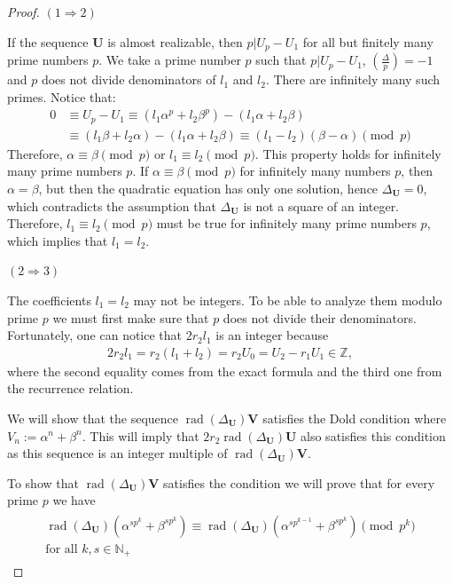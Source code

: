 \documentclass[preprint,12pt]{elsarticle}
\newcommand{\N}{\mathbb{N}}
\newcommand{\Z}{\mathbb{Z}}
\DeclareMathOperator{\rad}{rad}
\begin{document}
\begin{proof}

    $(1\Rightarrow 2)$

    If the sequence ${\mathbf U}$ is almost realizable, then $p|U_p-U_1$ for all but finitely many prime numbers $p$. We take a prime number $p$ such that $p|U_p-U_1$, $\left(\frac{\Delta}{p}\right)=-1$ and $p$ does not divide denominators of $l_1$ and $l_2$. There are infinitely many such primes. Notice that:
    \begin{equation}
      \begin{split}
            0 &\equiv
            U_p - U_1 \equiv
            (l_1\alpha^p + l_2\beta^p) - (l_1\alpha + l_2\beta) \\ 
            &\equiv 
            (l_1\beta + l_2\alpha) - (l_1\alpha + l_2\beta) \equiv
            (l_1-l_2)(\beta - \alpha) \pmod p
      \end{split}
      \end{equation}
    Therefore, $\alpha \equiv \beta \pmod p$ or $l_1 \equiv l_2 \pmod p$. This property holds for infinitely many prime numbers $p$. If $\alpha \equiv \beta \pmod p$ for infinitely many numbers $p$, then  $\alpha = \beta$, but then the quadratic equation has only one solution, hence $\Delta_{\mathbf U} = 0$, which contradicts the assumption that $\Delta_{\mathbf U}$ is not a square of an integer. Therefore, $l_1 \equiv l_2 \pmod p$ must be true for infinitely many prime numbers $p$, which implies that $l_1=l_2$.

    \vskip 0.5cm
    \noindent $(2\Rightarrow3)$

    The coefficients $l_1 = l_2$ may not be integers. To be able to analyze them modulo prime $p$ we must first make sure that $p$ does not divide their denominators. Fortunately, one can notice that $2r_2l_1$ is an integer because
    \begin{align}
        2r_2l_1 = r_2(l_1+l_2) = r_2U_0 = U_2 - r_1U_1 \in \Z ,
    \end{align}
    where the second equality comes from the exact formula and the third one from the recurrence relation.

    We will show that the sequence $\rad(\Delta_\mathbf{U})\mathbf{V}$ satisfies the Dold condition where ${V}_n := \alpha^n+\beta^n$. This will imply that $2r_2\rad(\Delta_\mathbf{U})\mathbf{U}$ also satisfies this condition as this sequence is an integer multiple of $\rad(\Delta_\mathbf{U})\mathbf{V}$. 

    To show that $\rad(\Delta_\mathbf{U})\mathbf{V}$ satisfies the condition we will prove that for every prime $p$ we have
    \begin{align}\label{the_not_sq_e1}
        \begin{split}
        \rad(\Delta_\mathbf{U})\left(\alpha^{sp^k}+\beta^{sp^k}\right) \equiv 
        \rad(\Delta_\mathbf{U})\left(\alpha^{sp^{k-1}}+\beta^{sp^k}\right) 
        \pmod {p^k} 
        \\ \text{for all $k, s\in \N_+$}
        \end{split}
    \end{align}


\end{proof}
\end{document}
